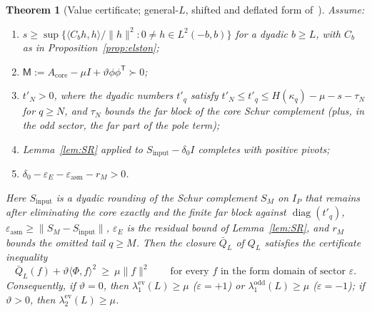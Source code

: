 \documentclass[11pt]{amsart}
\newcommand{\ev}{\mathrm{ev}}
\newcommand{\od}{\mathrm{odd}}
\newcommand{\Tp}{\mathsf T}
\newtheorem{theorem}{Theorem}[section]
\theoremstyle{definition}
\theoremstyle{remark}
\numberwithin{equation}{section}
\begin{document}
\begin{theorem}[Value certificate; general-$L$, shifted and deflated form of~{\cite[(9.1)--(9.2)]{rh60}}]\label{thm:V}
Assume:
\begin{enumerate}
\item[(V1)] $s\ge\sup\{\langle C_bh,h\rangle/\|h\|^2:0\ne h\in L^2(-b,b)\}$ for a dyadic $b\ge L$, with $C_b$ as in Proposition~\ref{prop:elston};
\item[(V2)] $\mathsf M:=A_{\mathrm{core}}-\mu I+\vartheta\phi\phi^{\Tp}\succ0$;
\item[(V3)] $t'_N>0$, where the dyadic numbers $t'_q$ satisfy $t'_N\le t'_q\le H(\kappa_q)-\mu-s-\tau_N$ for $q\ge N$, and $\tau_N$ bounds the far block of the core Schur complement (plus, in the odd sector, the far part of the pole term);
\item[(V4)] Lemma~\ref{lem:SR} applied to $S_{\mathrm{input}}-\delta_0I$ completes with positive pivots;
\item[(V5)] $\delta_0-\varepsilon_E-\varepsilon_{\mathrm{asm}}-r_M>0$.
\end{enumerate}
Here $S_{\mathrm{input}}$ is a dyadic rounding of the Schur complement $S_M$ on $I_P$ that remains after eliminating the core exactly and the finite far block against $\operatorname{diag}(t'_q)$, $\varepsilon_{\mathrm{asm}}\ge\|S_M-S_{\mathrm{input}}\|$, $\varepsilon_E$ is the residual bound of Lemma~\ref{lem:SR}, and $r_M$ bounds the omitted tail $q\ge M$. Then the closure $\bar Q_L$ of $Q_L$ satisfies the \emph{certificate inequality}
\begin{equation}\label{eq:certV}
\bar Q_L(f)+\vartheta\langle\Phi,f\rangle^2\ \ge\ \mu\|f\|^2\qquad\text{for every $f$ in the form domain of sector }\varepsilon.
\end{equation}
Consequently, if $\vartheta=0$, then $\lambda_1^\ev(L)\ge\mu$ ($\varepsilon=+1$) or $\lambda_1^\od(L)\ge\mu$ ($\varepsilon=-1$); if $\vartheta>0$, then $\lambda_2^\ev(L)\ge\mu$.
\end{theorem}
\end{document}
